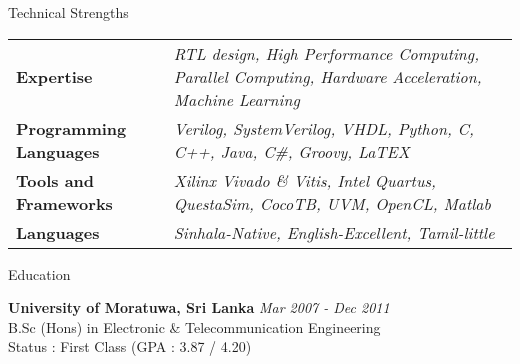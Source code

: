 \documentclass[
11pt, %
]{./../assets/resume} %
\begin{document}
\begin{rSection}{Technical Strengths}
	
	\def\arraystretch{1.5}
	
	\begin{tabular}{p{2.0in} p{4.5in}}
		\textbf{Expertise} & \emph{RTL design, High Performance Computing, Parallel Computing, Hardware Acceleration, Machine Learning} \\
		\textbf{Programming Languages} & \emph{Verilog, SystemVerilog, VHDL, Python, C, C++, Java, C\#, Groovy, LaTEX} \\
		\textbf{Tools and Frameworks} & \emph{Xilinx Vivado \& Vitis, Intel Quartus, QuestaSim, CocoTB, UVM, OpenCL, Matlab} \\ 
		\textbf{Languages} & \emph{Sinhala-Native, English-Excellent, Tamil-little} \\
	\end{tabular}
	
\end{rSection}


\begin{rSection}{Education}
	
	\textbf{University of Moratuwa, Sri Lanka} \hfill \textit{Mar 2007 - Dec 2011} \\ 
	B.Sc (Hons) in Electronic \& Telecommunication Engineering \\
	Status : First Class (GPA : 3.87 / 4.20)
	
\end{rSection}

\end{document}
